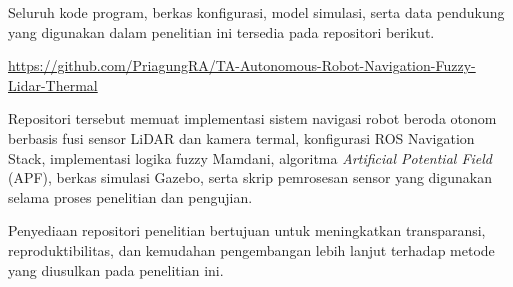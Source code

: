 Seluruh kode program, berkas konfigurasi, model simulasi, serta data pendukung yang digunakan dalam penelitian ini tersedia pada repositori berikut.

\begin{center}
\url{https://github.com/PriagungRA/TA-Autonomous-Robot-Navigation-Fuzzy-Lidar-Thermal}
\end{center}

Repositori tersebut memuat implementasi sistem navigasi robot beroda otonom berbasis fusi sensor LiDAR dan kamera termal, konfigurasi ROS Navigation Stack, implementasi logika fuzzy Mamdani, algoritma \textit{Artificial Potential Field} (APF), berkas simulasi Gazebo, serta skrip pemrosesan sensor yang digunakan selama proses penelitian dan pengujian.

Penyediaan repositori penelitian bertujuan untuk meningkatkan transparansi, reproduktibilitas, dan kemudahan pengembangan lebih lanjut terhadap metode yang diusulkan pada penelitian ini.